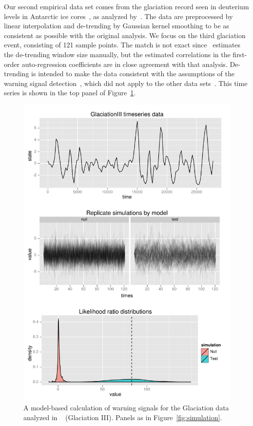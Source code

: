 \documentclass[authoryear,review,11pt]{elsarticle}
\begin{document}
Our second empirical data set comes from the glaciation record seen
in deuterium levels in Antarctic ice cores~\citep{Petit1999},
as analyzed by~\citet{Dakos2008}.
The data are preprocessed by linear interpolation and de-trending by Gaussian kernel smoothing
to be as consistent as possible with the original analysis.
We focus on the third glaciation event, consisting of 121 sample points.
The match is not exact since~\citet{Dakos2008} estimates the de-trending window size manually,
but the estimated correlations in the first-order auto-regression coefficients are in close agreement with that analysis.
De-trending is intended to make the data consistent with the assumptions of the warning signal detection~\citep{Dakos2008},
which did not apply to the other data sets~\citep{Drake2010}.
This time series is shown in the top panel of Figure~\ref{fig:glaciation}.
 \begin{figure}
   \begin{center}
     \includegraphics[width=.85\linewidth]{figures/GlaciationIII_warningsignal.pdf}
     \caption{A model-based calculation of warning signals for the Glaciation data analyzed in ~\citet{Dakos2008} (Glaciation III).  Panels as in Figure~\ref{fig:simulation}.}
     \label{fig:glaciation}
  \end{center}
 \end{figure}
\end{document}
